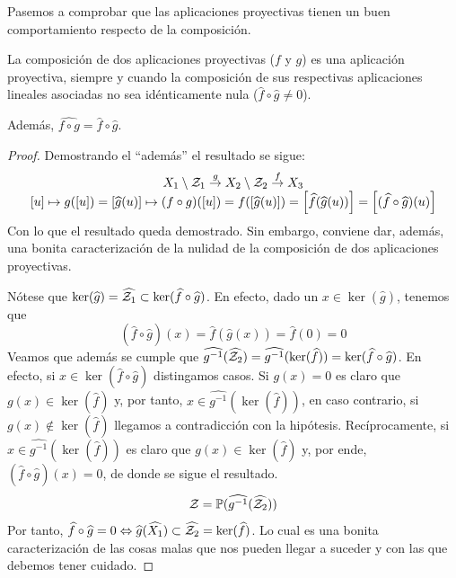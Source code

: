 Pasemos a comprobar que las aplicaciones proyectivas tienen un buen comportamiento respecto de la composición.
\begin{lem}
	\label{C4_lem_composicionProyectivas}
	La composición de dos aplicaciones proyectivas ($f$ y $g$) es una aplicación proyectiva, siempre y cuando la composición de sus respectivas aplicaciones lineales asociadas no sea idénticamente nula ($\widehat{f}\circ \widehat{g}\not=0$).
	
	Además, $\widehat{f\circ g}=\widehat{f}\circ\widehat{g}$.
\end{lem}
\begin{proof}
	Demostrando el ``además'' el resultado se sigue:
	\[\begin{array}{c}X_1\setminus\mathcal{Z}_1 \stackrel{g}{\to} X_2\setminus\mathcal{Z}_2 \stackrel{f}{\to} X_3\\
	\left [ u \right ] \mapsto g(\left [ u \right ])=\left [ \widehat{g}(u) \right ] \mapsto (f\circ g)(\left [ u \right ])=f(\left [ \widehat{g}(u) \right ])=\left [ \widehat{f}(\widehat{g}(u)) \right ]=\left [ (\widehat{f}\circ\widehat{g})(u) \right ]
	\end{array}\]
	Con lo que el resultado queda demostrado. Sin embargo, conviene dar, además, una bonita caracterización de la nulidad de la composición de dos aplicaciones proyectivas.
	
	Nótese que $\ker(\widehat{g})=\widehat{\mathcal{Z}_1}\subset\ker(\widehat{f}\circ\widehat{g})$. En efecto, dado un $x\in\ker(\widehat{g})$, tenemos que
	\[(\widehat{f}\circ\widehat{g})(x)=\widehat{f}(\widehat{g}(x))=\widehat{f}(0)=0\]
	Veamos que además se cumple que $\widehat{g^{-1}}(\widehat{\mathcal{Z}_2})=\widehat{g^{-1}}(\ker(\widehat{f}))=\ker(\widehat{f}\circ\widehat{g})$. En efecto, si $x\in\ker(\widehat{f}\circ\widehat{g})$ distingamos casos. Si $g(x)=0$ es claro que $g(x)\in\ker(\widehat{f})$ y, por tanto, $x\in\widehat{g^{-1}}(\ker(\widehat{f}))$, en caso contrario, si $g(x)\not\in\ker(\widehat{f})$ llegamos a contradicción con la hipótesis. Recíprocamente, si $x\in\widehat{g^{-1}}(\ker(\widehat{f}))$ es claro que $g(x)\in\ker(\widehat{f})$ y, por ende, $(\widehat{f}\circ\widehat{g})(x)=0$, de donde se sigue el resultado.
	\[\mathcal{Z}=\mathbb{P}(\widehat{g^{-1}}(\widehat{\mathcal{Z}_2}))\]
	Por tanto, $\widehat{f}\circ \widehat{g}=0\Leftrightarrow \widehat{g}(\widehat{X_1})\subset\widehat{\mathcal{Z}_2}=\ker(\widehat{f})$. Lo cual es una bonita caracterización de las cosas malas que nos pueden llegar a suceder y con las que debemos tener cuidado.
\end{proof}

